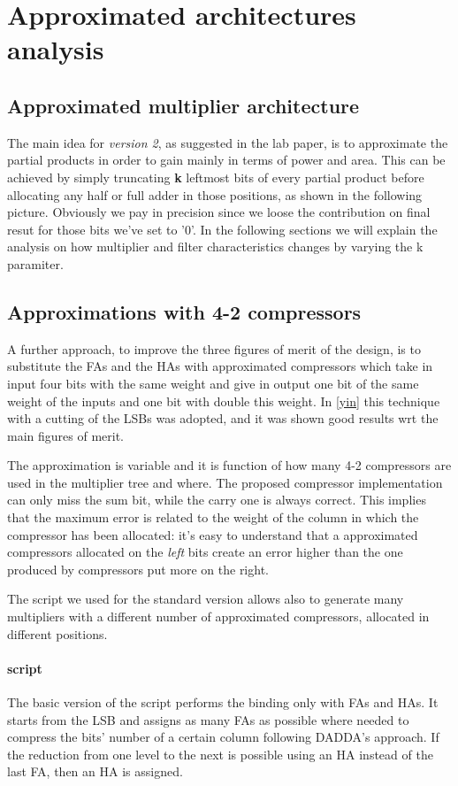 \documentclass[a4paper]{article}
\begin{document}
	\section{Approximated architectures analysis}
	\subsection{Approximated multiplier architecture}
	The main idea for \textit{version 2}, as suggested in the lab paper, is to approximate the partial products in order to gain mainly in terms of power and area.
	This can be achieved by simply truncating \textbf{k} leftmost bits of every partial product before allocating any half or full adder in those positions, as shown in the following picture.
	Obviously we pay in precision since we loose the contribution on final resut for those bits we've set to '0'. In the following sections we will explain the analysis on how multiplier and filter characteristics changes by varying the k paramiter.


	\subsection{Approximations with 4-2 compressors}
	A further approach, to improve the three figures of merit of the design, is to substitute the FAs and the HAs with approximated compressors which take in input four bits with the same weight and give in output one bit of the same weight of the inputs and one bit with double this weight.
	In \ref{yin} this technique with a cutting of the LSBs was adopted, and it was shown good results wrt the main figures of merit.

	The approximation is variable and it is function of how many 4-2 compressors are used in the multiplier tree and where. The proposed compressor implementation can only miss the sum bit, while the carry one is always correct.
	This implies that the maximum error is related to the weight of the column in which the compressor has been allocated: it's easy to understand that a approximated compressors allocated on the \textit{left} bits create an error higher than the one produced by compressors put more on the right.

	The script we used for the standard version allows also to generate many multipliers with a different number of approximated compressors, allocated in different positions.

	\paragraph{script} The basic version of the script performs the binding only with FAs and HAs. It starts from the LSB and assigns as many FAs as possible where needed to compress the bits' number of a certain column following DADDA's approach. If the reduction from one level to the next is possible using an HA instead of the last FA, then an HA is assigned.
\end{document}
